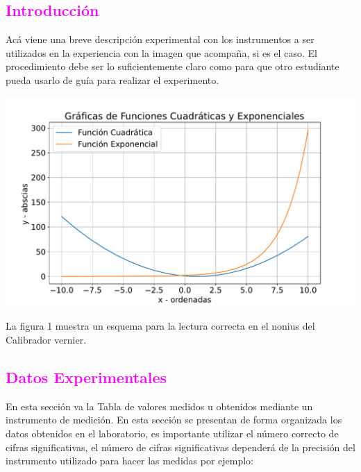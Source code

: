 \documentclass[11pt]{article}
\begin{document}
\begin{multicols}{2}
        \subsection{\textbf{\textcolor{magenta}{Introducción}}}
        \noindent Acá viene una breve descripción experimental con los instrumentos a ser utilizados en la experiencia con la imagen que acompaña, si es el caso. El procedimiento debe ser lo suficientemente claro como para que otro estudiante pueda usarlo de guía para realizar el experimento.
        \begin{center}
            \includegraphics[scale=0.3]{exp}
        \end{center}
        \noindent La figura 1 muestra un esquema para la lectura correcta en el nonius del Calibrador vernier.

        \subsection{\textbf{\textcolor{magenta}{Datos Experimentales}}}
        \noindent En esta sección va la Tabla de valores medidos u obtenidos mediante un instrumento de medición. En esta sección se presentan de forma organizada los datos obtenidos en el laboratorio, es importante utilizar el número correcto de cifras significativas, el número de cifras significativas dependerá de la precisión del instrumento utilizado para hacer las medidas por ejemplo:


\end{multicols}
\end{document}
